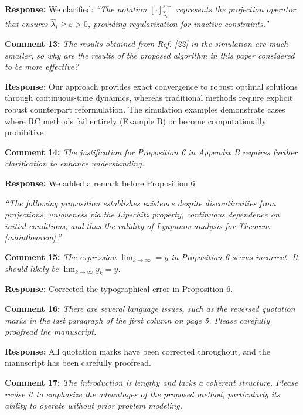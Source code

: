\documentclass[journal,twoside,web]{ieeecolor}
\begin{document}
\noindent\textbf{Response:} We clarified: {\color{revisionblue}\textit{``The notation $[\cdot]_{\hat{\lambda}_i}^{\varepsilon+}$ represents the projection operator that ensures $\hat{\lambda}_i \geq \varepsilon > 0$, providing regularization for inactive constraints.''}}

\vspace{0.5em}
\noindent\textbf{Comment 13:} \textit{The results obtained from Ref. [22] in the simulation are much smaller, so why are the results of the proposed algorithm in this paper considered to be more effective?}

\noindent\textbf{Response:} Our approach provides exact convergence to robust optimal solutions through continuous-time dynamics, whereas traditional methods require explicit robust counterpart reformulation. The simulation examples demonstrate cases where RC methods fail entirely (Example B) or become computationally prohibitive.

\vspace{0.5em}
\noindent\textbf{Comment 14:} \textit{The justification for Proposition 6 in Appendix B requires further clarification to enhance understanding.}

\noindent\textbf{Response:} We added a remark before Proposition 6:

{\color{revisionblue}\textit{``The following proposition establishes existence despite discontinuities from projections, uniqueness via the Lipschitz property, continuous dependence on initial conditions, and thus the validity of Lyapunov analysis for Theorem \ref{maintheorem}.''}}

\vspace{0.5em}
\noindent\textbf{Comment 15:} \textit{The expression $\lim_{k \to \infty}=y$ in Proposition 6 seems incorrect. It should likely be $\lim_{k \to \infty} y_k=y$.}

\noindent\textbf{Response:} Corrected the typographical error in Proposition 6.

\vspace{0.5em}
\noindent\textbf{Comment 16:} \textit{There are several language issues, such as the reversed quotation marks in the last paragraph of the first column on page 5. Please carefully proofread the manuscript.}

\noindent\textbf{Response:} All quotation marks have been corrected throughout, and the manuscript has been carefully proofread.

\vspace{0.5em}
\noindent\textbf{Comment 17:} \textit{The introduction is lengthy and lacks a coherent structure. Please revise it to emphasize the advantages of the proposed method, particularly its ability to operate without prior problem modeling.}
\end{document}
